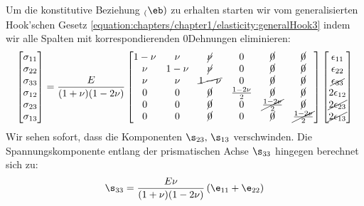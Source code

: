 \documentclass[letterpaper,10pt,german]{jupyterBook}
\begin{document}
\sphinxAtStartPar
Um die konstitutive Beziehung \(\sb(\eb)\) zu erhalten starten wir vom generalisierten Hook’schen Gesetz \eqref{equation:chapters/chapter1/elasticity:generalHook3} indem wir alle Spalten mit korrespondierenden 0\sphinxhyphen{}Dehnungen eliminieren:
\begin{equation}\label{equation:chapters/chapter1/elasticity:evz1}
\begin{split}\begin{bmatrix} 
\sigma_{11} \\
\sigma_{22} \\
\sigma_{33} \\
\sigma_{12} \\
\sigma_{23} \\
\sigma_{13} 
\end{bmatrix} = \frac{E}{(1+\nu)(1-2\nu)}\begin{bmatrix}
1-\nu & \nu & \cancel{\nu} & 0 & \cancel{0} & \cancel{0} \\
\nu & 1-\nu & \cancel{\nu} & 0 & \cancel{0} & \cancel{0} \\
\nu & \nu & \cancel{1-\nu} & 0 & \cancel{0} & \cancel{0} \\
0 & 0 & \cancel{0} & \frac{1-2\nu}{2} & \cancel{0} & \cancel{0} \\
0 & 0 & \cancel{0} & 0 & \cancel{\frac{1-2\nu}{2}} & \cancel{0} \\
0 & 0 & \cancel{0} & 0 & \cancel{0} & \cancel{\frac{1-2\nu}{2}} \\ 
\end{bmatrix} \begin{bmatrix} \epsilon_{11} \\ \epsilon_{22} \\ \cancel{\epsilon_{33}} \\ 2\epsilon_{12} \\ \cancel{2\epsilon_{23}} \\ \cancel{2\epsilon_{13}} \end{bmatrix}\end{split}
\end{equation}
\sphinxAtStartPar
Wir sehen sofort, dass die Komponenten \(\s_{23},\, \s_{13}\) verschwinden. Die Spannungskomponente entlang der prismatischen Achse \(\s_{33}\) hingegen berechnet sich zu:
\begin{equation*}
\begin{split}\s_{33} = \frac{E \nu}{(1+\nu)(1-2\nu)} \left(\e_{11} + \e_{22} \right)\end{split}
\end{equation*}
\end{document}
